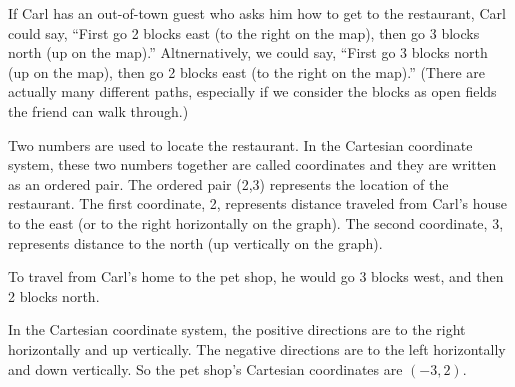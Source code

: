 \documentclass{ximera}
\begin{document}
If Carl has an out-of-town guest who asks him how to get to the restaurant, Carl could say, ``First go 2 blocks east (to the right on the map), then go 3 blocks north (up on the map).'' Altnernatively, we could say, ``First go 3 blocks north (up on the map), then go 2 blocks east (to the right on the map).'' (There are actually many different paths, especially if we consider the blocks as open fields the friend can walk through.)

Two numbers are used to locate the restaurant. In the Cartesian coordinate system, these two numbers together are called coordinates and they are written as an ordered pair. The ordered pair (2,3) represents the location of the restaurant. The first coordinate, 2, represents distance traveled from Carl's house to the east (or to the right horizontally on the graph). The second coordinate, 3, represents distance to the north (up vertically on the graph).

\begin{image} 
\end{image}

To travel from Carl's home to the pet shop, he would go 3 blocks west, and then 2 blocks north.

In the Cartesian coordinate system, the positive directions are to the right horizontally and up vertically. The negative directions are to the left horizontally and down vertically. So the pet shop's Cartesian coordinates are $(-3,2)$.
\end{document}
